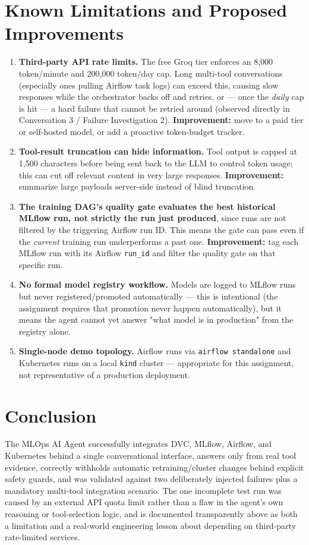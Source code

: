 \documentclass[11pt,a4paper]{article}
\begin{document}
\section{Known Limitations and Proposed Improvements}
\label{sec:limitations}

\begin{enumerate}
  \item \textbf{Third-party API rate limits.} The free Groq tier enforces
  an 8{,}000 token/minute and 200{,}000 token/day cap. Long multi-tool
  conversations (especially ones pulling Airflow task logs) can exceed
  this, causing slow responses while the orchestrator backs off and
  retries, or --- once the \emph{daily} cap is hit --- a hard failure that
  cannot be retried around (observed directly in Conversation 3 / Failure
  Investigation 2). \textbf{Improvement:} move to a paid tier or
  self-hosted model, or add a proactive token-budget tracker.
  \item \textbf{Tool-result truncation can hide information.} Tool output
  is capped at 1{,}500 characters before being sent back to the LLM to
  control token usage; this can cut off relevant content in very large
  responses. \textbf{Improvement:} summarize large payloads server-side
  instead of blind truncation.
  \item \textbf{The training DAG's quality gate evaluates the best
  historical MLflow run, not strictly the run just produced}, since runs
  are not filtered by the triggering Airflow run ID. This means the gate
  can pass even if the \emph{current} training run underperforms a past
  one. \textbf{Improvement:} tag each MLflow run with its Airflow
  \texttt{run\_id} and filter the quality gate on that specific run.
  \item \textbf{No formal model registry workflow.} Models are logged to
  MLflow runs but never registered/promoted automatically --- this is
  intentional (the assignment requires that promotion never happen
  automatically), but it means the agent cannot yet answer "what model is
  in production" from the registry alone.
  \item \textbf{Single-node demo topology.} Airflow runs via
  \texttt{airflow standalone} and Kubernetes runs on a local \texttt{kind}
  cluster --- appropriate for this assignment, not representative of a
  production deployment.
\end{enumerate}

\section{Conclusion}

The MLOps AI Agent successfully integrates DVC, MLflow, Airflow, and
Kubernetes behind a single conversational interface, answers only from real
tool evidence, correctly withholds automatic retraining/cluster changes
behind explicit safety guards, and was validated against two deliberately
injected failures plus a mandatory multi-tool integration scenario. The one
incomplete test run was caused by an external API quota limit rather than a
flaw in the agent's own reasoning or tool-selection logic, and is documented
transparently above as both a limitation and a real-world engineering
lesson about depending on third-party rate-limited services.
\end{document}
